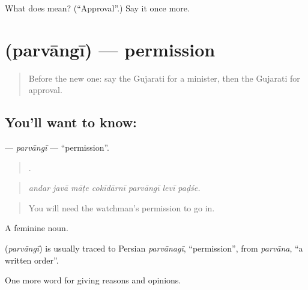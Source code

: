 \begin{tcolorbox}[breakable,colback=teal!4,colframe=teal!35!black,title={Before you move on}]
What does  mean? (\textquotedblleft{}Approval\textquotedblright{}.) Say it once more.
\end{tcolorbox}
\section[\texorpdfstring{\gu{પરવાનગી} (parvāngī)}{પરવાનગી (parvāngī)}]{ (parvāngī) — permission}

\label{lesson:GU-C354-parvangi}



\begin{quote}
Before the new one: say the Gujarati for a minister, then the Gujarati for approval.
\end{quote}

\subsection*{You'll want to know: }
\textbf{} — \emph{parvāngī} — \textquotedblleft{}permission\textquotedblright{}.

\begin{quote}
      .
\end{quote}

\begin{quote}
\emph{andar javā māṭe cokīdārnī parvāngī levī paḍśe.}
\end{quote}

\begin{quote}
You will need the watchman's permission to go in.
\end{quote}

A feminine noun.

\begin{cousinweb}
\textbf{} (\emph{parvāngī}) is usually traced to Persian \emph{parvānagī}, \textquotedblleft{}permission\textquotedblright{}, from \emph{parvāna}, \textquotedblleft{}a written order\textquotedblright{}.
\end{cousinweb}

\begin{grammarlens}[title={What you've built}]
One more word for giving reasons and opinions.
\end{grammarlens}

